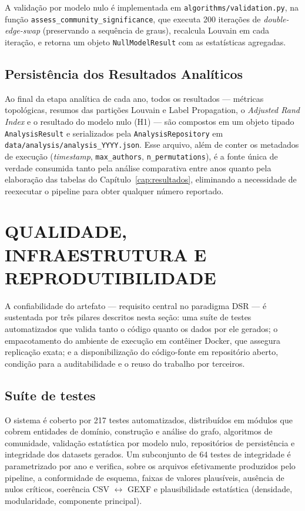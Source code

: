 \documentclass[
      12pt,
      a4paper,
      openright,
      oneside,
      chapter=TITLE,
      section=TITLE,
      english,
      french,
      spanish,
      brazilian
    ]{abntex2}
\begin{document}
    A validação por modelo nulo é implementada em \texttt{algorithms/validation.py}, na função \texttt{assess\_community\_significance}, que executa 200 iterações de \textit{double-edge-swap} (preservando a sequência de graus), recalcula Louvain em cada iteração, e retorna um objeto \texttt{NullModelResult} com as estatísticas agregadas.
    
    \subsection{Persistência dos Resultados Analíticos}
    
    Ao final da etapa analítica de cada ano, todos os resultados --- métricas
    topológicas, resumos das partições Louvain e Label Propagation, o \textit{Adjusted
    Rand Index} e o resultado do modelo nulo (H1) --- são compostos em um objeto
    tipado \texttt{AnalysisResult} e serializados pela \texttt{AnalysisRepository} em
    \texttt{data/analysis/analysis\_YYYY.json}. Esse arquivo, além de conter os
    metadados de execução (\textit{timestamp}, \texttt{max\_authors},
    \texttt{n\_permutations}), é a fonte única de verdade consumida tanto pela
    análise comparativa entre anos quanto pela elaboração das tabelas do
    Capítulo~\ref{cap:resultados}, eliminando a necessidade de reexecutar o pipeline
    para obter qualquer número reportado.
    
    \section{QUALIDADE, INFRAESTRUTURA E REPRODUTIBILIDADE}

    A confiabilidade do artefato --- requisito central no paradigma DSR --- é sustentada por três pilares descritos nesta seção: uma suíte de testes automatizados que valida tanto o código quanto os dados por ele gerados; o empacotamento do ambiente de execução em contêiner Docker, que assegura replicação exata; e a disponibilização do código-fonte em repositório aberto, condição para a auditabilidade e o reuso do trabalho por terceiros.

    \subsection{Suíte de testes}
    
    O sistema é coberto por 217 testes automatizados, distribuídos em módulos que
    cobrem entidades de domínio, construção e análise do grafo, algoritmos de
    comunidade, validação estatística por modelo nulo, repositórios de persistência e
    integridade dos datasets gerados. Um subconjunto de 64 testes de integridade é
    parametrizado por ano e verifica, sobre os arquivos efetivamente produzidos pelo
    pipeline, a conformidade de esquema, faixas de valores plausíveis, ausência de
    nulos críticos, coerência CSV $\leftrightarrow$ GEXF e plausibilidade estatística
    (densidade, modularidade, componente principal).
    
\end{document}
